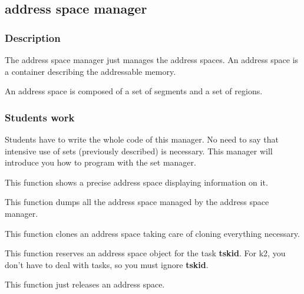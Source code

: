 %
%

\subsection{address space manager}

\subsubsection{Description}

The address space manager just  manages the address spaces. An address
space is a container describing the addressable memory.

An address space is composed of a set of segments and a set of regions.

\subsubsection{Students work}

Students have to write the whole  code of this manager. No need to say
that intensive use of  sets (previously described) is necessary.  This
manager will introduce you how to program with the set manager.


This function shows a precise address space displaying information
on it.


This function dumps all the address space managed by the address
space manager.


This function clones an address space taking care of cloning everything
necessary.


This  function   reserves  an  address  space  object   for  the  task
\textbf{tskid}. For k2, you don't have to deal with tasks, so you must
ignore \textbf{tskid}.


This function just  releases an address space.

